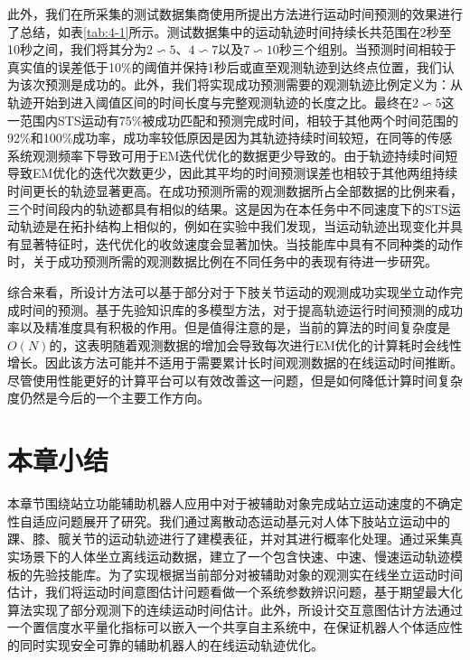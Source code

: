 此外，我们在所采集的测试数据集商使用所提出方法进行运动时间预测的效果进行了总结，如表\ref{tab:4-1}所示。测试数据集中的运动轨迹时间持续长共范围在2秒至10秒之间，我们将其分为$2\backsim 5$、$4\backsim 7$以及$7\backsim 10$秒三个组别。当预测时间相较于真实值的误差低于10\%的阈值并保持1秒后或直至观测轨迹到达终点位置，我们认为该次预测是成功的。此外，我们将实现成功预测需要的观测轨迹比例定义为：从轨迹开始到进入阈值区间的时间长度与完整观测轨迹的长度之比。最终在$2\backsim 5$这一范围内STS运动有75\%被成功匹配和预测完成时间，相较于其他两个时间范围的92\%和100\%成功率，成功率较低原因是因为其轨迹持续时间较短，在同等的传感系统观测频率下导致可用于EM迭代优化的数据更少导致的。由于轨迹持续时间短导致EM优化的迭代次数更少，因此其平均的时间预测误差也相较于其他两组持续时间更长的轨迹显著更高。在成功预测所需的观测数据所占全部数据的比例来看，三个时间段内的轨迹都具有相似的结果。这是因为在本任务中不同速度下的STS运动轨迹是在拓扑结构上相似的，例如在实验中我们发现，当运动轨迹出现变化并具有显著特征时，迭代优化的收敛速度会显著加快。当技能库中具有不同种类的动作时，关于成功预测所需的观测数据比例在不同任务中的表现有待进一步研究。

综合来看，所设计方法可以基于部分对于下肢关节运动的观测成功实现坐立动作完成时间的预测。基于先验知识库的多模型方法，对于提高轨迹运行时间预测的成功率以及精准度具有积极的作用。但是值得注意的是，当前的算法的时间复杂度是$O(N)$的，这表明随着观测数据的增加会导致每次进行EM优化的计算耗时会线性增长。因此该方法可能并不适用于需要累计长时间观测数据的在线运动时间推断。尽管使用性能更好的计算平台可以有效改善这一问题，但是如何降低计算时间复杂度仍然是今后的一个主要工作方向。

\section{本章小结}
本章节围绕站立功能辅助机器人应用中对于被辅助对象完成站立运动速度的不确定性自适应问题展开了研究。我们通过离散动态运动基元对人体下肢站立运动中的踝、膝、髋关节的运动轨迹进行了建模表征，并对其进行概率化处理。通过采集真实场景下的人体坐立离线运动数据，建立了一个包含快速、中速、慢速运动轨迹模板的先验技能库。为了实现根据当前部分对被辅助对象的观测实在线坐立运动时间估计，我们将运动时间意图估计问题看做一个系统参数辨识问题，基于期望最大化算法实现了部分观测下的连续运动时间估计。此外，所设计交互意图估计方法通过一个置信度水平量化指标可以嵌入一个共享自主系统中，在保证机器人个体适应性的同时实现安全可靠的辅助机器人的在线运动轨迹优化。
